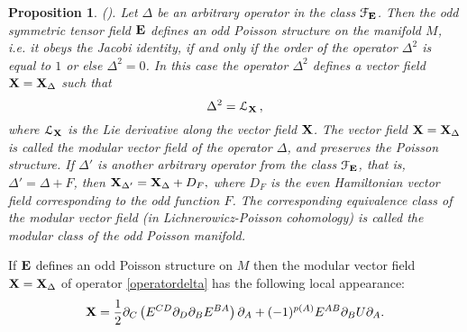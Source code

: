 \documentclass[12pt,reqno,a4paper]{amsart}
\newtheorem{proposition}{Proposition}
\theoremstyle{definition}
\begin{document}
\begin{proposition}\label{khudped} (\cite{KhPed1}).
  {\it Let $\Delta$ be an arbitrary operator in the class ${{\mathcal{F}}}_{{\bf E}}$.
  Then the odd symmetric tensor field ${{\bf E}}$
defines an odd Poisson structure on the manifold $M$, i.e.
it obeys the
Jacobi identity, if and only if the order of the operator $\Delta^2$
is equal to $1$ or else $\Delta^2=0$. In this case
 the operator $\Delta^2$ defines a vector field ${{\bf X}}={{\bf X}}_\Delta$ such that
    \begin{equation}\label{mod vf}
    \Delta^2={{\mathcal{L}}}_{{\bf X}}\,,
    \end{equation}
  where ${{\mathcal{L}}}_{{\bf X}}$ is the Lie derivative along the vector field ${{\bf X}}$.
The vector field ${{\bf X}}={{\bf X}}_\Delta$ is called the modular
vector field of the operator $\Delta$, and preserves
 the Poisson structure.
 If $\Delta'$ is another arbitrary operator from the class ${{\mathcal{F}}}_{{\bf E}}$,
that is, $\Delta'=\Delta+F$, then
         $
    {{\bf X}}_{\Delta'}={{\bf X}}_{\Delta}+D_F,
         $
where $D_F$ is the even Hamiltonian vector field corresponding
to the odd function $F$.
   The corresponding
  equivalence  class of the modular vector field
   (in Lichnerowicz-Poisson cohomology)  is called the
   modular class of the odd Poisson manifold.}
\end{proposition}

\smallskip

If ${{\bf E}}$ defines an odd Poisson structure on
$M$ then the modular vector field
  ${{\bf X}}={{\bf X}}_\Delta$ of operator \eqref{operatordelta}
has the following local appearance:
    \begin{equation}\label{mod vf local}
    {{\bf X}} =\frac{1}{2}{\partial}_C\left(E^{CD}{\partial}_D{\partial}_BE^{BA}\right){\partial}_A
     + (-1)^{p(A)}E^{AB}{\partial}_BU{\partial}_A.
    \end{equation}
\end{document}

